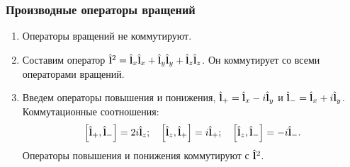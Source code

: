 \documentclass{beamer}
\begin{document}
    \begin{frame}\frametitle{Производные операторы вращений}

        \begin{enumerate}
            \item Операторы вращений не коммутируют.

            \item Составим оператор $\hat{\mathbf{l}}^2 = \hat{\mathbf{l}}_x \hat{\mathbf{l}}_x + \hat{\mathbf{l}}_y \hat{\mathbf{l}}_y + \hat{\mathbf{l}}_z \hat{\mathbf{l}}_z$. Он коммутирует со всеми операторами вращений.

            \item Введем операторы повышения и понижения, $\hat{\mathbf{l}}_{+} = \hat{\mathbf{l}}_x - i\hat{\mathbf{l}}_y$ и $\hat{\mathbf{l}}_{-} = \hat{\mathbf{l}}_x + i\hat{\mathbf{l}}_y$. Коммутационные соотношения:
            \begin{equation}
                \left[ \hat{\mathbf{l}}_{+}, \hat{\mathbf{l}}_{-} \right] = 2 i \hat{\mathbf{l}}_{z} ; \quad
                \left[ \hat{\mathbf{l}}_{z}, \hat{\mathbf{l}}_{+} \right] =   i \hat{\mathbf{l}}_{+} ; \quad
                \left[ \hat{\mathbf{l}}_{z}, \hat{\mathbf{l}}_{-} \right] = - i \hat{\mathbf{l}}_{-} .
            \end{equation}
            Операторы повышения и понижения коммутируют с $\hat{\mathbf{l}}^2$.
        \end{enumerate}

    \end{frame}

\end{document}
